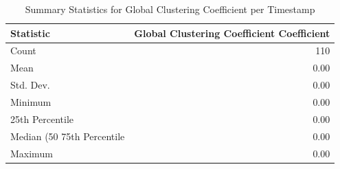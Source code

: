 \begin{table}[htbp]
\centering
\caption{Summary Statistics for Global Clustering Coefficient per Timestamp}
\label{tab:contiguity_global_clustering_coefficient}
\begin{tabular}{lr}
\toprule
Statistic & Global Clustering Coefficient Coefficient \\
\midrule
Count & 110 \\
Mean & 0.00 \\
Std. Dev. & 0.00 \\
Minimum & 0.00 \\
25th Percentile & 0.00 \\
Median (50%
75th Percentile & 0.00 \\
Maximum & 0.00 \\
\bottomrule
\end{tabular}
\end{table}
